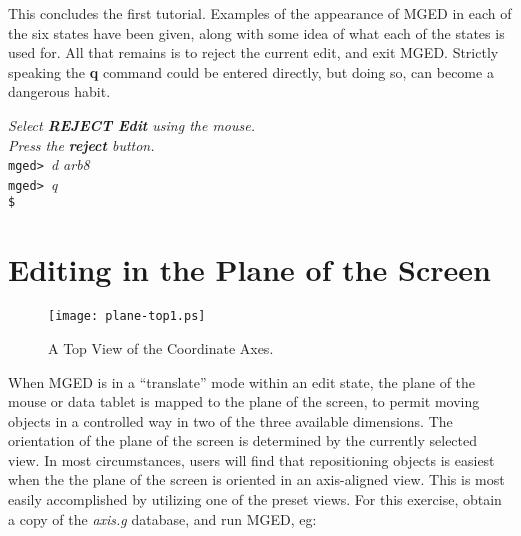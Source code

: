 This concludes the first tutorial.  Examples of the appearance of MGED
in each of the six states have been given, along with some idea of what
each of the states is used for.  All that remains is to reject the current
edit, and exit MGED.  Strictly speaking the {\bf q} command could be entered
directly, but doing so, can become a dangerous habit.

\noindent
{\em Select {\bf REJECT Edit} using the mouse.}\\
{\em Press the {\bf reject} button.}\\
{\tt mged> }{\em d arb8}\\
{\tt mged> }{\em q}\\
{\tt \$ }\\

\section{Editing in the Plane of the Screen}
\begin{figure}
\centering \texttt{[image: plane-top1.ps]}
\caption{A Top View of the Coordinate Axes.}
\label{plane-top1}
\end{figure}

When MGED is in a ``translate'' mode within an edit state,
the plane of the mouse or data tablet is mapped to
the plane of the screen, to permit moving objects in a
controlled way in two of the three available dimensions.
The orientation of the plane of the screen is determined by the
currently selected view.
In most circumstances, users will find that repositioning objects
is easiest when the the plane of the screen is oriented in an
axis-aligned view.  This is most easily accomplished by utilizing
one of the preset views.
For this exercise, obtain a copy of the {\em axis.g} database,
and run MGED, eg:


